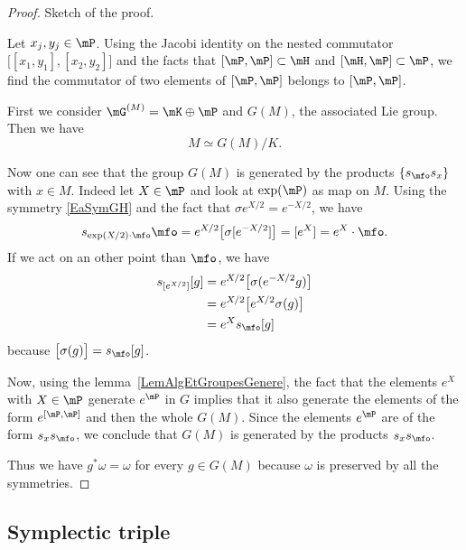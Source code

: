 \begin{proof}
	Sketch of the proof.

	Let $x_j,y_j\in\mP$. Using the Jacobi identity on the nested commutator $\big[ [x_1,y_1],[x_2,y_2] \big]$ and the facts that $[\mP,\mP]\subset\mH$ and $[\mH,\mP]\subset \mP$, we find the commutator of two elements of $[\mP,\mP]$ belongs to $[\mP,\mP]$.

	First we consider $\mG^{(M)}=\mK\oplus\mP$ and $G(M)$, the associated Lie group. Then we have
	\begin{equation}
		M\simeq G(M)/K.
	\end{equation}

	Now one can see that the group $G(M)$ is generated by the products $\{ s_{\mfo}s_x\}$ with $x\in M$. Indeed let $X\in\mP$ and look at $\exp(\mP)$ as map on $M$. Using the symmetry \eqref{EaSymGH} and the fact that $\sigma e^{X/2}= e^{-X/2}$, we have
	\begin{equation}
		s_{\exp(X/2)\cdot \mfo}\mfo= e^{X/2}\big[ \sigma[ e^{-X/2}] \big]=[ e^{X}]= e^{X}\cdot \mfo.
	\end{equation}
	If we act on an other point than $\mfo$, we have
	\begin{equation}
		\begin{aligned}[]
			s_{[ e^{X/2}]}[g]&= e^{X/2}\big[ \sigma( e^{-X/2}g) \big]\\
			&= e^{X/2}\big[  e^{X/2}\sigma(g) \big]\\
			&= e^{X}s_{\mfo}[g]
		\end{aligned}
	\end{equation}
	because $\big[ \sigma(g) \big]=s_{\mfo}[g]$.

	Now, using the lemma~\ref{LemAlgEtGroupesGenere}, the fact that the elements $ e^{X}$ with $X\in\mP$ generate $ e^{\mP}$ in $G$ implies that it also generate the elements of the form $ e^{[\mP,\mP]}$ and then the whole $G(M)$. Since the elements $ e^{\mP}$ are of the form $s_{x}s_{\mfo}$, we conclude that $G(M)$ is generated by the products $s_{x}s_{\mfo}$.

	Thus we have $g^*\omega=\omega$ for every $g\in G(M)$ because $\omega$ is preserved by all the symmetries.
\end{proof}

\subsection{Symplectic triple}
\label{SubSecTripleSylple}

